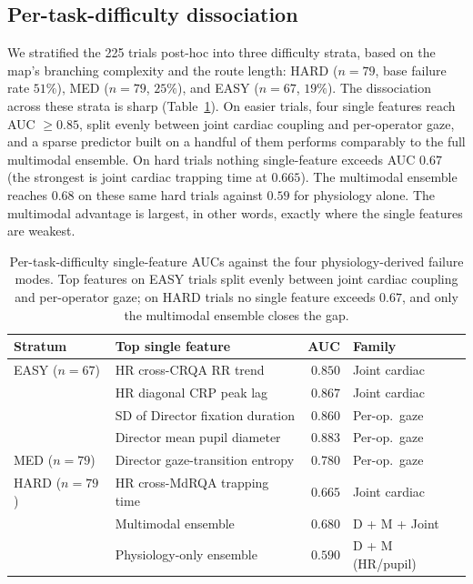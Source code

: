 \subsection{Per-task-difficulty dissociation}
We stratified the 225 trials post-hoc into three difficulty strata, based on the map's branching complexity and the route length: HARD ($n = 79$, base failure rate $51\%$), MED ($n = 79$, $25\%$), and EASY ($n = 67$, $19\%$). The dissociation across these strata is sharp (Table~\ref{tab:difficulty}). On easier trials, four single features reach AUC $\geq 0.85$, split evenly between joint cardiac coupling and per-operator gaze, and a sparse predictor built on a handful of them performs comparably to the full multimodal ensemble. On hard trials nothing single-feature exceeds AUC $0.67$ (the strongest is joint cardiac trapping time at $0.665$). The multimodal ensemble reaches $0.68$ on these same hard trials against $0.59$ for physiology alone. The multimodal advantage is largest, in other words, exactly where the single features are weakest.

\begin{table}[!t]
\caption[Per-task-difficulty single-feature AUCs per failure mode]{Per-task-difficulty single-feature AUCs against the four physiology-derived failure modes. Top features on EASY trials split evenly between joint cardiac coupling and per-operator gaze; on HARD trials no single feature exceeds $0.67$, and only the multimodal ensemble closes the gap.}
\label{tab:difficulty}
\centering
\footnotesize
\begin{tabular}{llrl}
\toprule
Stratum & Top single feature & AUC & Family \\
\midrule
EASY ($n = 67$) & HR cross-CRQA RR trend & $0.850$ & Joint cardiac \\
                & HR diagonal CRP peak lag & $0.867$ & Joint cardiac \\
                & SD of Director fixation duration & $0.860$ & Per-op.\ gaze \\
                & Director mean pupil diameter & $0.883$ & Per-op.\ gaze \\
\midrule
MED ($n = 79$)  & Director gaze-transition entropy & $0.780$ & Per-op.\ gaze \\
\midrule
HARD ($n = 79$) & HR cross-MdRQA trapping time & $0.665$ & Joint cardiac \\
                & Multimodal ensemble & $0.680$ & D + M + Joint \\
                & Physiology-only ensemble & $0.590$ & D + M (HR/pupil) \\
\bottomrule
\end{tabular}
\end{table}


